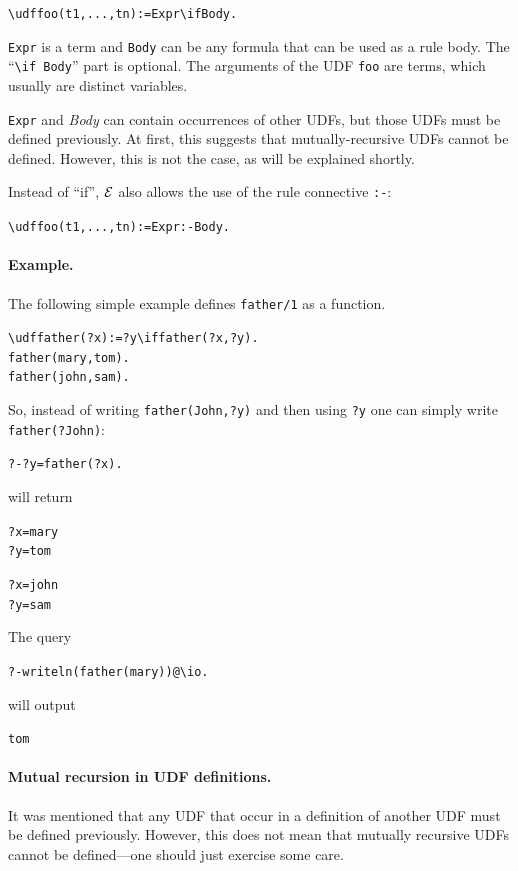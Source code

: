 \documentclass[11pt]{article}
\newcommand{\ERGO}{\mbox{\ensuremath{\cal{E}}\smaller{{\sc{RGO}}}}\xspace}
\newcommand{\FLSYSTEM}{\ERGO}
\newcommand{\bs}{\textbackslash}
\begin{document}
\begin{alltt}
    \bs{}udf foo(t1,...,tn) := Expr \bs{}if Body.
\end{alltt}

\noindent
\texttt{Expr} is a term and \texttt{Body} can be any formula that can be
used as a rule body.
The ``\texttt{\bs{}if Body}'' part is optional.
The arguments of the UDF \texttt{foo} are
terms, which usually are distinct variables.

\texttt{Expr} and \emph{Body} can contain occurrences of other UDFs, but those
UDFs must be defined previously. At first, this suggests that
mutually-recursive UDFs cannot be defined. However, this is not the case,
as will be explained shortly.

\medskip

\noindent
Instead of ``if'', \FLSYSTEM also allows the use of the rule connective
\texttt{:-}: 
\begin{alltt}
    \bs{}udf foo(t1,...,tn) := Expr :- Body.
\end{alltt}

\paragraph{Example.}
The following simple example defines \texttt{father/1} as a function.
\begin{alltt}
    \bs{}udf father(?x):=?y \bs{}if father(?x,?y).
    father(mary,tom).
    father(john,sam).
\end{alltt}
\noindent
So, instead of writing \texttt{father(John,?y)}  and then using \texttt{?y}
one can simply write \texttt{father(?John)}:  
\begin{alltt}
    ?- ?y=father(?x).
\end{alltt}
will return
\begin{alltt}
    ?x=mary
    ?y=tom

    ?x=john
    ?y=sam
\end{alltt}
The query
\begin{alltt}
    ?- writeln(father(mary))@\bs{}io.
\end{alltt}
will output
\begin{alltt}
    tom
\end{alltt}

\paragraph{Mutual recursion in UDF definitions.}
It was mentioned that any UDF that occur in a definition of another UDF
must be defined previously. However, this does not mean that mutually
recursive UDFs cannot be defined---one should just exercise some care.
\end{document}
